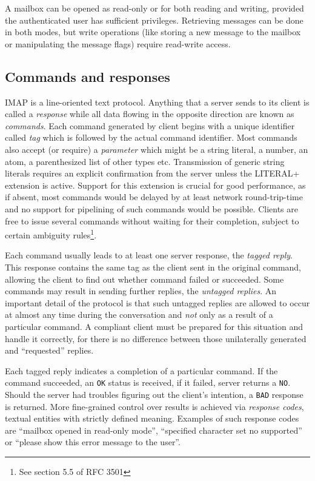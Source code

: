 \documentclass[12pt,notitlepage]{report}
\begin{document}
A mailbox can be opened as read-only or for both reading and writing, provided the
authenticated user has sufficient privileges.  Retrieving messages can be done in
both modes, but write operations (like storing a new message to the mailbox or
manipulating the message flags) require read-write access.

\subsection{Commands and responses}
\label{response-code}

IMAP is a line-oriented text protocol.  Anything that a server sends to its client
is called a {\em response} while all data flowing in the opposite direction are
known as {\em commands}.  Each command generated by client begins with a unique
identifier called {\em tag} which is followed by the actual command identifier.
Most commands also accept (or require) a {\em parameter} which might be a string
literal, a number, an atom, a parenthesized list of other types etc.
Transmission of generic string literals requires an explicit confirmation from
the server unless the LITERAL+ \cite{rfc-literalplus} extension is active.
Support for this extension is crucial for good performance, as if absent, most
commands would be delayed by at least network round-trip-time and no support for
pipelining of such commands would be possible.  Clients are free to issue several
commands without waiting for their completion, subject to certain ambiguity
rules\footnote{See section 5.5 of RFC 3501}.

Each command usually leads to at least one server response, the {\em tagged
reply}.  This response contains the same tag as the client sent in the original
command, allowing the client to find out whether command failed or succeeded.
Some commands may result in sending further replies, the {\em untagged replies}.
An important detail of the protocol is that such untagged replies are allowed to
occur at almost any time during the conversation and {\em not} only as a result
of a particular command.  A compliant client must be prepared for this situation
and handle it correctly, for there is no difference between those unilaterally
generated and ``requested'' replies.

Each tagged reply indicates a completion of a particular command.  If the
command succeeded, an {\tt OK} status is received, if it failed, server returns
a {\tt NO}.  Should the server had troubles figuring out the client's intention,
a {\tt BAD} response is returned.  More fine-grained control over results is
achieved via {\em response codes}, textual entities with strictly defined
meaning.  Examples of such response codes are ``mailbox opened in read-only
mode'', ``specified character set no supported'' or ``please show this error
message to the user''.
\end{document}
